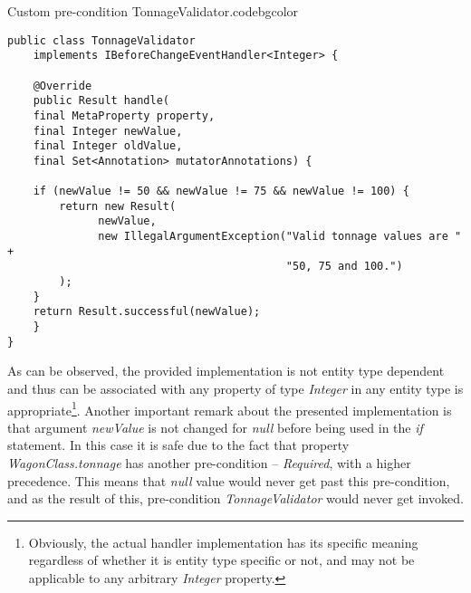   \begin{code}{Custom pre-condition TonnageValidator.}{\label{lst:TonnageValidator}}{codebgcolor}
    \begin{lstlisting}
public class TonnageValidator 
    implements IBeforeChangeEventHandler<Integer> {

    @Override
    public Result handle(
	final MetaProperty property, 
	final Integer newValue, 
	final Integer oldValue, 
	final Set<Annotation> mutatorAnnotations) {
	
	if (newValue != 50 && newValue != 75 && newValue != 100) {
	    return new Result(
		      newValue, 
		      new IllegalArgumentException("Valid tonnage values are " +
	    		                           "50, 75 and 100.")
	    );
	}
	return Result.successful(newValue);
    }
}
    \end{lstlisting}
  \end{code}

  As can be observed, the provided implementation is not entity type dependent and thus can be associated with any property of type \emph{Integer} in any entity type is appropriate\footnote{Obviously, the actual handler implementation has its specific meaning regardless of whether it is entity type specific or not, and may not be applicable to any arbitrary \emph{Integer} property.}.
  Another important remark about the presented implementation is that argument \emph{newValue} is not changed for \emph{null} before being used in the \emph{if} statement.
  In this case it is safe due to the fact that property \emph{WagonClass.tonnage} has another pre-condition -- \emph{Required}, with a higher precedence.
  This means that \emph{null} value would never get past this pre-condition, and as the result of this, pre-condition \emph{TonnageValidator} would never get invoked.

